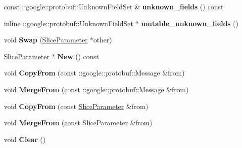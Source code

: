 \begin{DoxyCompactItemize}
const \+::google\+::protobuf\+::\+Unknown\+Field\+Set \& {\bfseries unknown\+\_\+fields} () const
\item 
\mbox{\label{classcaffe_1_1_slice_parameter_a60f18e6b423a96ee2a7ebae1b6c568e7}} 
inline \+::google\+::protobuf\+::\+Unknown\+Field\+Set $\ast$ {\bfseries mutable\+\_\+unknown\+\_\+fields} ()
\item 
\mbox{\label{classcaffe_1_1_slice_parameter_a23dd8e55eb852604de9cc8ff1b4a9064}} 
void {\bfseries Swap} (\mbox{\hyperlink{classcaffe_1_1_slice_parameter}{Slice\+Parameter}} $\ast$other)
\item 
\mbox{\label{classcaffe_1_1_slice_parameter_a9f243407b0320f09a6c2e271486a4062}} 
\mbox{\hyperlink{classcaffe_1_1_slice_parameter}{Slice\+Parameter}} $\ast$ {\bfseries New} () const
\item 
\mbox{\label{classcaffe_1_1_slice_parameter_a571331949db9760a00744b19b7d4b6aa}} 
void {\bfseries Copy\+From} (const \+::google\+::protobuf\+::\+Message \&from)
\item 
\mbox{\label{classcaffe_1_1_slice_parameter_a09c0bfcaa7e9848c95a08aa8502197eb}} 
void {\bfseries Merge\+From} (const \+::google\+::protobuf\+::\+Message \&from)
\item 
\mbox{\label{classcaffe_1_1_slice_parameter_aa5cb13b54e7e79d680a71b0b82cff139}} 
void {\bfseries Copy\+From} (const \mbox{\hyperlink{classcaffe_1_1_slice_parameter}{Slice\+Parameter}} \&from)
\item 
\mbox{\label{classcaffe_1_1_slice_parameter_a325d7d5633eec5fc8461b2e8aa075247}} 
void {\bfseries Merge\+From} (const \mbox{\hyperlink{classcaffe_1_1_slice_parameter}{Slice\+Parameter}} \&from)
\item 
\mbox{\label{classcaffe_1_1_slice_parameter_aec083f23853a1a40d271469f92507f29}} 
void {\bfseries Clear} ()
\item 
\mbox{\label{classcaffe_1_1_slice_parameter_abe501cc4c21704c7830ae2dd30db56e6}} 

\end{DoxyCompactItemize}
